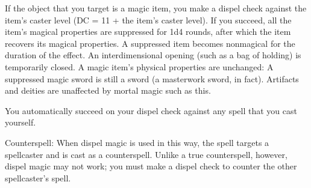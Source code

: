 {If the object that you target is a magic item, you make a dispel check against the item's caster level (DC = 11 + the item's caster level). If you succeed, all the item's magical properties are suppressed for 1d4 rounds, after which the item recovers its magical properties. A suppressed item becomes nonmagical for the duration of the effect. An interdimensional opening (such as a bag of holding) is temporarily closed. A magic item's physical properties are unchanged: A suppressed magic sword is still a sword (a masterwork sword, in fact). Artifacts and deities are unaffected by mortal magic such as this.

You automatically succeed on your dispel check against any spell that you cast yourself.

Counterspell: When dispel magic is used in this way, the spell targets a spellcaster and is cast as a counterspell. Unlike a true counterspell, however, dispel magic may not work; you must make a dispel check to counter the other spellcaster's spell.}
        
